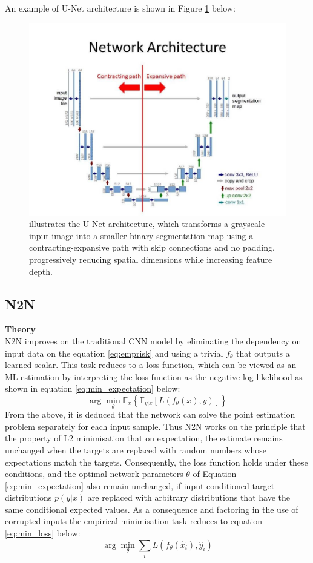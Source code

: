 An example of \gls{U-Net} architecture is shown in Figure \ref{fig:Unet} below:
\begin{figure}[h!]
	\centering
	\includegraphics[width=0.7\linewidth]{3_Chapters//3_Chapter_Methodology//Figures/Unet.jpg}
	\caption{illustrates the \gls{U-Net} architecture, which transforms a grayscale input image into a smaller binary segmentation map using a contracting-expansive path with skip connections and no padding, progressively reducing spatial dimensions while increasing feature depth.}
	\label{fig:Unet}
\end{figure}


\subsection{\gls{N2N}}

\textbf{Theory}\\
N2N improves on the traditional CNN model by eliminating the dependency on input data on the equation \ref{eq:emprisk} and using a trivial $f_{\theta}$ that outputs a learned scalar. This task reduces to a loss function, which can be viewed as an \gls{ML} estimation by interpreting the loss function as the negative log-likelihood as shown in equation \ref{eq:min_expectation} below:
\begin{equation}
	\arg\min_{\theta} \mathbb{E}_{x} \left\{ \mathbb{E}_{y|x} \left[ L(f_{\theta}(x), y) \right] \right\}
	\label{eq:min_expectation}
\end{equation}
From the above, it is deduced that the network can solve the point estimation problem separately for each input sample. Thus \gls{N2N} works on the principle that the property of L2 minimisation that on expectation, the estimate remains unchanged when the targets are replaced with random numbers whose expectations match the targets. Consequently, the loss function holds under these conditions, and the optimal network parameters $\theta$ of Equation \ref{eq:min_expectation} also remain unchanged, if input-conditioned target distributions $p(y|x)$  are replaced with arbitrary distributions that have the same conditional expected values.  As a consequence and  factoring in the use of corrupted inputs the empirical minimisation task reduces to equation \ref{eq:min_loss} below:
\begin{equation}
	\arg\min_{\theta} \sum_{i} L\left( f_{\theta}(\hat{x}_i), \hat{y}_i \right)
	\label{eq:min_loss}
\end{equation}

